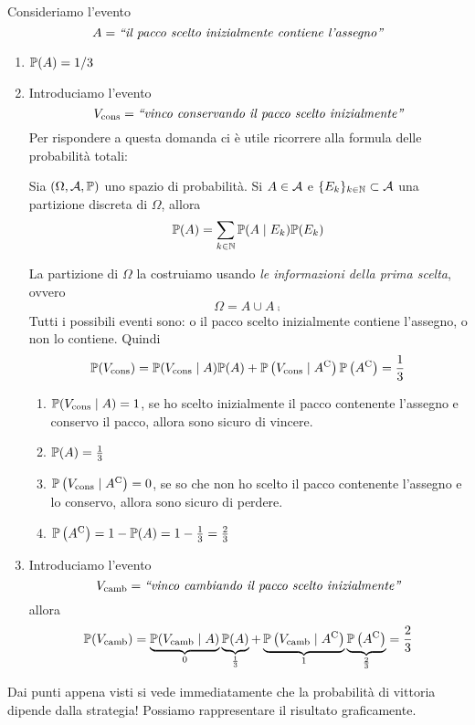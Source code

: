Consideriamo l'evento
\begin{equation*}
	A=\emph{``il pacco scelto inizialmente contiene l'assegno''}
\end{equation*}
\begin{enumerate}
	\item $\mathbb{P}(A) =1/3$
	\item Introduciamo l'evento
	\begin{equation*}
		V_{\text{cons}} =\emph{``vinco conservando il pacco scelto inizialmente''}
	\end{equation*}
	Per rispondere a questa domanda ci è utile ricorrere alla formula delle probabilità totali:
	\begin{theorem}
		Sia $(\Omega,\mathcal{A},\mathbb{P})$ uno spazio di probabilità. Si $A\in \mathcal{A}$ e $\{E_{k}\}_{k\in \mathbb{N}} \subset \mathcal{A}$ una partizione discreta di $\Omega $, allora
		\begin{equation*}
			\mathbb{P}(A) =\sum\limits_{k\in \mathbb{N}}\mathbb{P}(A\mid E_{k})\mathbb{P}(E_{k})
		\end{equation*}
	\end{theorem}
	La partizione di $\Omega $ la costruiamo usando \textit{le informazioni della prima scelta}, ovvero
	\begin{equation*}
		\Omega =A\cup A\comp
	\end{equation*}
	Tutti i possibili eventi sono: o il pacco scelto inizialmente contiene l'assegno, o non lo contiene. Quindi
	\begin{equation*}
		\mathbb{P}(V_{\text{cons}}) =\mathbb{P}(V_{\text{cons}} \mid A)\mathbb{P}(A) +\mathbb{P}\left(V_{\text{cons}} \mid A^{\mathrm{C}}\right)\mathbb{P}\left(A^{\mathrm{C}}\right) =\frac{1}{3}
	\end{equation*}
	\begin{enumerate}
		\item $\mathbb{P}(V_{\text{cons}} \mid A) =1$, se ho scelto inizialmente il pacco contenente l'assegno e conservo il pacco, allora sono sicuro di vincere.
		\item $\mathbb{P}(A) =\frac{1}{3}$
		\item $\mathbb{P}\left(V_{\text{cons}} \mid A^{\mathrm{C}}\right) =0$, se so che non ho scelto il pacco contenente l'assegno e lo conservo, allora sono sicuro di perdere.
		\item $\mathbb{P}\left(A^{\mathrm{C}}\right) =1-\mathbb{P}(A) =1-\frac{1}{3} =\frac{2}{3}$
	\end{enumerate}
	\item Introduciamo l'evento
	\begin{equation*}
		V_{\text{camb}} =\emph{``vinco cambiando il pacco scelto inizialmente''}
	\end{equation*}
	allora
	\begin{equation*}
		\mathbb{P}(V_{\text{camb}}) =\underbrace{\mathbb{P}(V_{\text{camb}} \mid A)}_{0}\underbrace{\mathbb{P}(A)}_{\frac{1}{3}} +\underbrace{\mathbb{P}\left(V_{\text{camb}} \mid A^{\mathrm{C}}\right)}_{1}\underbrace{\mathbb{P}\left(A^{\mathrm{C}}\right)}_{\frac{2}{3}} =\frac{2}{3}
	\end{equation*}
\end{enumerate}
Dai punti appena visti si vede immediatamente che la probabilità di vittoria dipende dalla strategia! Possiamo rappresentare il risultato graficamente.

